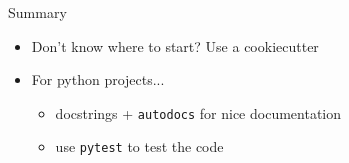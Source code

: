 \documentclass[xcolor=table,aspectratio=169]{beamer}
\numberwithin{equation}{section}
\begin{document}
\begin{frame}{Summary}
  \begin{itemize}
    \item Don't know where to start? Use a cookiecutter
    \item For python projects...
          \begin{itemize}
            \item docstrings + \texttt{autodocs} for nice documentation
            \item use \texttt{pytest} to test the code
          \end{itemize}
  \end{itemize}
\end{frame}
\end{document}
